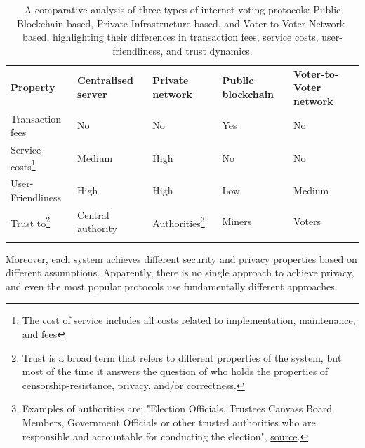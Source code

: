 \documentclass[runningheads]{llncs}
\begin{document}
\begin{table}[!h]
\centering
\newcommand{\YES}{\cellcolor{red!50}Yes}
\newcommand{\NO}{\cellcolor{green!50}No}
\begin{tabular}{p{}p{}p{}p{}p{}}
\noalign{\smallskip}\hline\noalign{\smallskip}
\textbf{Property} & \textbf{Centralised server} & \textbf{Private network} & \textbf{Public blockchain} & \textbf{Voter-to-Voter network}\\
\noalign{\smallskip}\hline\noalign{\smallskip}
Transaction fees & \NO & \NO & \YES & \NO \\
\hline
Service costs\footnote{The cost of service includes all costs related to implementation, maintenance, and fees} & \cellcolor{yellow!50} Medium & \cellcolor{red!50} High & \cellcolor{green!50} No  & \cellcolor{green!50} No \\
\hline
User-Friendliness & \cellcolor{green!50} High & \cellcolor{green!50}High & \cellcolor{red!50} Low & \cellcolor{yellow!50} Medium \\
\hline
Trust to\footnote{Trust is a broad term that refers to different properties of the system, but most of the time it answers the question of who holds the properties of censorship-resistance, privacy, and/or correctness.} & \cellcolor{red!50} Central authority & \cellcolor{yellow!50} Authorities\footnote{Examples of authorities are: "Election Officials, Trustees Canvass Board Members, Government Officials or other trusted authorities who are responsible and accountable for conducting the election", \href{http://www.electionguard.vote/basics/steps/1_Key_Ceremony/}{source}.} & \cellcolor{yellow!50} Miners & \cellcolor{yellow!50} Voters  \\
\noalign{\smallskip}\hline
\hline
\end{tabular}

\caption{A comparative analysis of three types of internet voting protocols: Public Blockchain-based, Private Infrastructure-based, and Voter-to-Voter Network-based, highlighting their differences in transaction fees, service costs, user-friendliness, and trust dynamics.}
\label{table-comparision}

\end{table}

Moreover, each system achieves different security and privacy properties based on different assumptions. Apparently, there is no single approach to achieve privacy, and even the most popular protocols use fundamentally different approaches.
\end{document}
